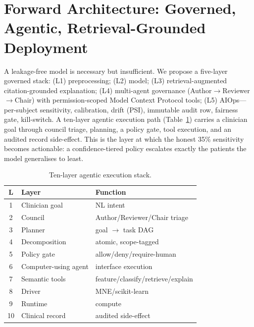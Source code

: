 \documentclass[10pt,journal,twocolumn]{IEEEtran}
\begin{document}
\section{Forward Architecture: Governed, Agentic, Retrieval-Grounded Deployment}\label{sec:fwd}
A leakage-free model is necessary but insufficient. We propose a five-layer governed stack: (L1) preprocessing; (L2) model; (L3) retrieval-augmented citation-grounded explanation; (L4) multi-agent governance (Author$\rightarrow$Reviewer$\rightarrow$Chair) with permission-scoped Model Context Protocol tools; (L5) AIOps---per-subject sensitivity, calibration, drift (PSI), immutable audit row, fairness gate, kill-switch. A ten-layer agentic execution path (Table~\ref{tab:stack}) carries a clinician goal through council triage, planning, a policy gate, tool execution, and an audited record side-effect. This is the layer at which the honest 35\% sensitivity becomes actionable: a confidence-tiered policy escalates exactly the patients the model generalises to least.
\begin{table}[h]\centering\caption{Ten-layer agentic execution stack.}\label{tab:stack}
\footnotesize\begin{tabular}{cll}\toprule
L & Layer & Function\\\midrule
1 & Clinician goal & NL intent\\
2 & Council & Author/Reviewer/Chair triage\\
3 & Planner & goal $\rightarrow$ task DAG\\
4 & Decomposition & atomic, scope-tagged\\
5 & Policy gate & allow/deny/require-human\\
6 & Computer-using agent & interface execution\\
7 & Semantic tools & feature/classify/retrieve/explain\\
8 & Driver & MNE/scikit-learn\\
9 & Runtime & compute\\
10 & Clinical record & audited side-effect\\\bottomrule
\end{tabular}\end{table}
\end{document}
